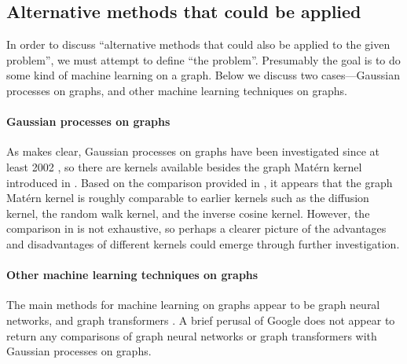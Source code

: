 \subsection{Alternative methods that could be applied}


In order to discuss ``alternative methods that could also be applied to the given problem'', we must attempt to define ``the problem''. Presumably the goal is to do some kind of machine learning on a graph. Below we discuss two cases---Gaussian processes on graphs, and other machine learning techniques on graphs.

\paragraph{Gaussian processes on graphs} As \cite{pmlr-v130-borovitskiy21a} makes clear, Gaussian processes on graphs have been investigated since at least 2002 \cite{kondor2002diffusion}, so there are kernels available besides the graph Mat\'{e}rn kernel introduced in \cite{pmlr-v130-borovitskiy21a}. Based on the comparison provided in \cite{pmlr-v130-borovitskiy21a}, it appears that the graph Mat\'{e}rn kernel is roughly comparable to earlier kernels such as the diffusion kernel, the random walk kernel, and the inverse cosine kernel. However, the comparison in \cite{pmlr-v130-borovitskiy21a} is not exhaustive, so perhaps a clearer picture of the advantages and disadvantages of different kernels could emerge through further investigation.

\paragraph{Other machine learning techniques on graphs} The main methods for machine learning on graphs appear to be graph neural networks, and graph transformers \cite{huggraph, stangraph}. A brief perusal of Google does not appear to return any comparisons of graph neural networks or graph transformers with Gaussian processes on graphs.


